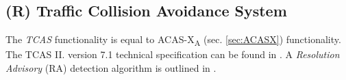 \subsection{(R) Traffic Collision Avoidance System}\label{sec:TCAS}

\noindent The \emph{TCAS} functionality is equal to ACAS-X\textsubscript{A} (sec. \ref{sec:ACASX}) functionality. The TCAS II. version 7.1 technical specification can be found in \cite{federal2011introduction}. A \emph{Resolution Advisory} (RA) detection algorithm is outlined in  \cite{munoz2013tcas}.